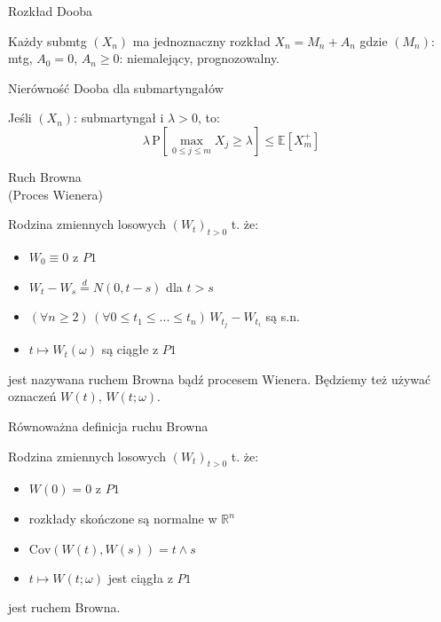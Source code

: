 \documentclass[avery5371, grid, frame]{flashcards}
\begin{document}
\begin{flashcard}[Twierdzenie]{Rozkład Dooba}

\smallskip
Każdy submtg $(X_n)$ ma jednoznaczny rozkład $X_n = M_n + A_n$ gdzie $(M_n)$: mtg, $A_0 = 0$, $A_n \geq 0$: niemalejący, prognozowalny.
\end{flashcard}

\begin{flashcard}[Twierdzenie]{Nierówność Dooba dla submartyngałów}

\smallskip
Jeśli $(X_n)$: submartyngał i $\lambda > 0$, to:
$$ \lambda \, \text{P} \left[ \max _{ 0 \leq j \leq m} X_j \geq \lambda \right] \leq \mathbb{E}[X ^+ _m] $$
\end{flashcard}


\begin{flashcard}[Definicja]{Ruch Browna \\ (Proces Wienera)}

Rodzina zmiennych losowych $ \left( W_t \right) _{t > 0} $ t. że:
\begin{itemize}
\item $W_0 \equiv 0$ z $P1$
\item $W_t - W_s \stackrel{d}{=} N(0, t-s)$ dla $ t > s $
\item $(\forall {n \geq 2}) \, (\forall { 0 \leq t_1 \leq ... \leq t_n }) \, W_{t_j} - W_{t_i}$ są s.n.
\item $t \mapsto W_t(\omega)$ są ciągłe z $P1$
\end{itemize}
jest nazywana ruchem Browna bądź procesem Wienera. Będziemy też używać oznaczeń $W(t)$, $W(t; \omega)$.
\end{flashcard}

\begin{flashcard}[Twierdzenie]{Równoważna definicja ruchu Browna}

\smallskip
Rodzina zmiennych losowych $ \left( W_t \right) _{t > 0} $ t. że:
\begin{itemize}
\item $W(0) = 0$ z $P1$
\item rozkłady skończone są normalne w $\mathbb{R}^n$
\item $\text{Cov}(W(t), W(s)) = t \wedge s$
\item $t \mapsto W(t; \omega)$ jest ciągła z $P1$
\end{itemize}
jest ruchem Browna.
\end{flashcard}
\end{document}
